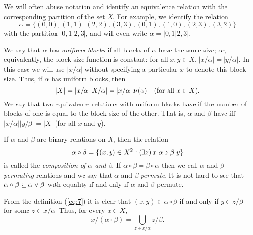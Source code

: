 We will often abuse notation and identify an equivalence relation with the
corresponding partition of the set $X$.  For example, we identify
the relation 
\[
\alpha = \{(0,0), (1,1), (2,2), (3,3), (0,1), (1,0), (2,3), (3,2)\}
\]
with the partition $|0,1|2,3|$, and will even write $\alpha = |0,1|2,3|$. 

We say that $\alpha$ has \emph{uniform blocks} if all blocks of  $\alpha$ have
the same size; or, equivalently, the block-size function is constant: for all 
$x, y \in X$, $|x/\alpha| = |y/\alpha|$.  
In this case we will use $|x/\alpha|$ without specifying
a particular $x$ to denote this block size.
Thus, if $\alpha$
has uniform blocks, then
\[
|X|= |x/\alpha| |X/\alpha| = |x/\alpha| \operatorname{\boldsymbol{\nu}}(\alpha) \quad \text{(for all $x\in X$).}
\]
We say that two equivalence relations with uniform
blocks  have 
 if the number of blocks of one is equal to
the block size of the other. That is,
$\alpha$ and $\beta$ 
have \cubs
iff $|x/\alpha||y/\beta| = |X|$ (for all $x$ and $y$).


If $\alpha$ and $\beta$ are binary relations on $X$, then the relation
\begin{equation}
  \label{eq:7}
\alpha \circ \beta = \{(x,y) \in X^2: (\exists z)\, x \mathrel{\alpha} z
\mathrel{\beta} y\}
\end{equation}
is called the \emph{composition of $\alpha$ and $\beta$}. If 
$\alpha \circ \beta = \beta \circ \alpha$ then we call $\alpha$ and $\beta$ 
\emph{permuting} relations and we say that $\alpha$ and $\beta$ \emph{permute}. 
It is not hard to see that $\alpha \circ \beta \subseteq \alpha \vee \beta$
with equality if and only if $\alpha$ and $\beta$ permute.

From the definition (\ref{eq:7}) it is clear that %
$(x,y) \in \alpha\circ \beta$ if and only if
$y \in z/\beta$ for some $z\in x/\alpha$.  Thus, for every $x\in X$,
  \begin{equation}
    \label{eq:1}
x/(\alpha\circ \beta) = \bigcup_{z \in x/\alpha} z/\beta.
  \end{equation}


